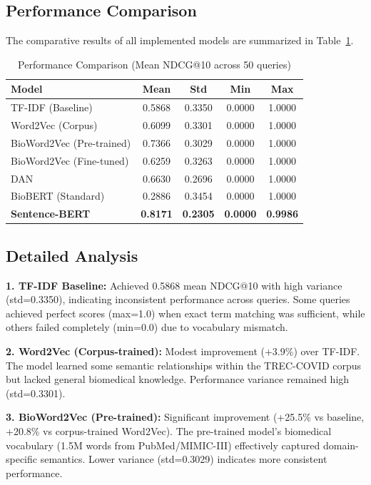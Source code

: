 \documentclass[sigconf,nonacm]{acmart}
\begin{document}
\subsection{Performance Comparison}
The comparative results of all implemented models are summarized in Table~\ref{tab:results}.

\begin{table}[h]
\caption{Performance Comparison (Mean NDCG@10 across 50 queries)}
\label{tab:results}
\begin{tabular}{lcccc}
\toprule
\textbf{Model} & \textbf{Mean} & \textbf{Std} & \textbf{Min} & \textbf{Max} \\
\midrule
TF-IDF (Baseline) & 0.5868 & 0.3350 & 0.0000 & 1.0000 \\
Word2Vec (Corpus) & 0.6099 & 0.3301 & 0.0000 & 1.0000 \\
BioWord2Vec (Pre-trained) & 0.7366 & 0.3029 & 0.0000 & 1.0000 \\
BioWord2Vec (Fine-tuned) & 0.6259 & 0.3263 & 0.0000 & 1.0000 \\
DAN & 0.6630 & 0.2696 & 0.0000 & 1.0000 \\
BioBERT (Standard) & 0.2886 & 0.3454 & 0.0000 & 1.0000 \\
\textbf{Sentence-BERT} & \textbf{0.8171} & \textbf{0.2305} & \textbf{0.0000} & \textbf{0.9986} \\
\bottomrule
\end{tabular}
\end{table}

\subsection{Detailed Analysis}

\textbf{1. TF-IDF Baseline:} Achieved 0.5868 mean NDCG@10 with high variance (std=0.3350), indicating inconsistent performance across queries. Some queries achieved perfect scores (max=1.0) when exact term matching was sufficient, while others failed completely (min=0.0) due to vocabulary mismatch.

\textbf{2. Word2Vec (Corpus-trained):} Modest improvement (+3.9\%) over TF-IDF. The model learned some semantic relationships within the TREC-COVID corpus but lacked general biomedical knowledge. Performance variance remained high (std=0.3301).

\textbf{3. BioWord2Vec (Pre-trained):} Significant improvement (+25.5\% vs baseline, +20.8\% vs corpus-trained Word2Vec). The pre-trained model's biomedical vocabulary (1.5M words from PubMed/MIMIC-III) effectively captured domain-specific semantics. Lower variance (std=0.3029) indicates more consistent performance.
\end{document}
